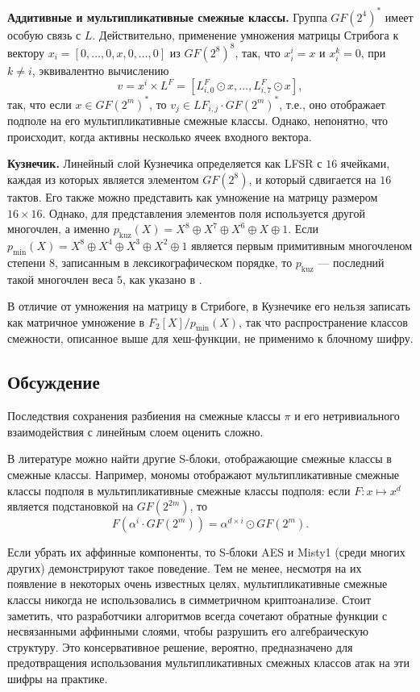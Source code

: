 \textbf{Аддитивные и мультипликативные смежные классы.} Группа $GF(2^4)^*$ имеет особую связь с $L$. Действительно, применение умножения матрицы Стрибога к вектору \(x_i = [0, \ldots, 0, x, 0, \ldots, 0]\) из $GF(2^8)^8$, так, что \(x_i^i = x\) и \(x_i^k = 0\), при \(k \neq i\), эквивалентно вычислению
\[
v = x^i \times L^F = [L^F_{i,0} \odot x, ..., L^F_{i,7} \odot x],
\]
так, что если \(x \in GF(2^m)^*\), то \(v_j \in LF_{i,j} \cdot GF(2^m)^*\), т.е., оно отображает подполе на его мультипликативные смежные классы. Однако, непонятно, что происходит, когда активны несколько ячеек входного вектора.

\textbf{Кузнечик.} Линейный слой Кузнечика определяется как LFSR с $16$ ячейками, каждая из которых является элементом $GF(2^8)$, и который сдвигается на $16$ тактов. Его также можно представить как умножение на матрицу размером $16 \times 16$. Однако, для представления элементов поля используется другой многочлен, а именно \(p_{\text{kuz}}(X) = X^8 \oplus X^7 \oplus X^6 \oplus X \oplus 1\). Если \(p_{\text{min}}(X) = X^8 \oplus X^4 \oplus X^3 \oplus X^2 \oplus 1\) является первым примитивным многочленом степени $8$, записанным в лексикографическом порядке, то \(p_{\text{kuz}}\) — последний такой многочлен веса $5$, как указано в \cite{LN97}.

В отличие от умножения на матрицу в Стрибоге, в Кузнечике его нельзя записать как матричное умножение в $F_2[X]/p_{\text{min}}(X)$, так что распространение классов смежности, описанное выше для хеш-функции, не применимо к блочному шифру.

\subsection{Обсуждение}

Последствия сохранения разбиения на смежные классы \(\pi\) и его нетривиального взаимодействия с линейным слоем оценить сложно.

В литературе можно найти другие S-блоки, отображающие смежные классы в смежные классы. Например, мономы отображают мультипликативные смежные классы подполя в мультипликативные смежные классы подполя: если \(F: x \mapsto x^d\) является подстановкой на $GF(2^{2m})$, то
\[
F(\alpha^i \cdot GF(2^m)) = \alpha^{d \times i} \odot GF(2^m).
\]

Если убрать их аффинные компоненты, то S-блоки AES \cite{AES01} и Misty1 \cite{Mat97} (среди многих других) демонстрируют такое поведение. Тем не менее, несмотря на их появление в некоторых очень известных целях, мультипликативные смежные классы никогда не использовались в симметричном криптоанализе. Стоит заметить, что разработчики алгоритмов всегда сочетают обратные функции с несвязанными аффинными слоями, чтобы разрушить его алгебраическую структуру. Это консервативное решение, вероятно, предназначено для предотвращения использования мультипликативных смежных классов атак на эти шифры на практике.

